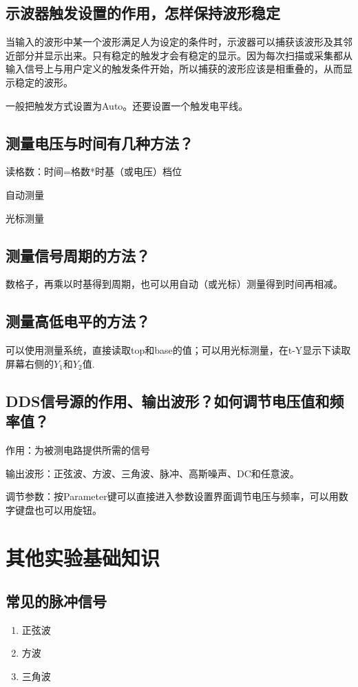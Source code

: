 \documentclass{ctexart}
\begin{document}
\subsection{示波器触发设置的作用，怎样保持波形稳定}
当输入的波形中某一个波形满足人为设定的条件时，示波器可以捕获该波形及其邻近部分并显示出来。只有稳定的触发才会有稳定的显示。因为每次扫描或采集都从输入信号上与用户定义的触发条件开始，所以捕获的波形应该是相重叠的，从而显示稳定的波形。

一般把触发方式设置为Auto。还要设置一个触发电平线。

\subsection{测量电压与时间有几种方法？}
读格数：时间=格数*时基（或电压）档位

自动测量

光标测量
\subsection{测量信号周期的方法？}
数格子，再乘以时基得到周期，也可以用自动（或光标）测量得到时间再相减。
\subsection{测量高低电平的方法？}
可以使用测量系统，直接读取top和base的值；可以用光标测量，在t-Y显示下读取屏幕右侧的$Y_1$和$Y_2$值.

\subsection{DDS信号源的作用、输出波形？如何调节电压值和频率值？}
作用：为被测电路提供所需的信号

输出波形：正弦波、方波、三角波、脉冲、高斯噪声、DC和任意波。

调节参数：按Parameter键可以直接进入参数设置界面调节电压与频率，可以用数字键盘也可以用旋钮。
\section{其他实验基础知识}
\subsection{常见的脉冲信号}

\begin{enumerate}
    \item 正弦波
    \item 方波
    \item 三角波
\end{enumerate}
\end{document}
